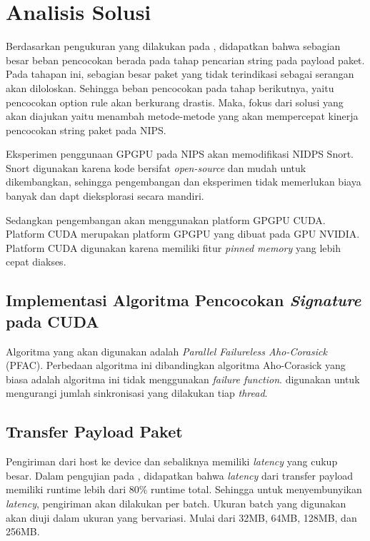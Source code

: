   \section{Analisis Solusi}
  

    Berdasarkan pengukuran yang dilakukan pada \parencite{kargus2012}, didapatkan bahwa sebagian besar beban pencocokan berada pada tahap  pencarian string pada payload paket. Pada tahapan ini, sebagian besar paket yang tidak terindikasi sebagai serangan akan diloloskan. Sehingga beban pencocokan pada tahap berikutnya, yaitu pencocokan option rule akan berkurang drastis. Maka, fokus dari solusi yang akan diajukan yaitu menambah metode-metode yang akan mempercepat kinerja pencocokan string paket pada NIPS.

    Eksperimen penggunaan GPGPU pada NIPS akan memodifikasi NIDPS Snort. Snort digunakan karena kode bersifat \emph{open-source} dan mudah untuk dikembangkan, sehingga pengembangan dan eksperimen tidak memerlukan biaya banyak dan dapt dieksplorasi secara mandiri. 

    Sedangkan pengembangan akan menggunakan platform GPGPU CUDA. Platform CUDA merupakan platform GPGPU yang dibuat pada GPU NVIDIA. Platform CUDA digunakan karena memiliki fitur \emph{pinned memory} yang lebih cepat diakses.

    \subsection{Implementasi Algoritma Pencocokan \emph{Signature} pada CUDA}

      Algoritma yang akan digunakan adalah \emph{Parallel Failureless Aho-Corasick} (PFAC). Perbedaan algoritma ini dibandingkan algoritma Aho-Corasick yang biasa adalah algoritma ini tidak menggunakan \emph{failure function}. digunakan untuk mengurangi jumlah sinkronisasi yang dilakukan tiap \emph{thread}. 

    \subsection{Transfer Payload Paket}

      Pengiriman dari host ke device dan sebaliknya memiliki \emph{latency} yang cukup besar. Dalam pengujian pada \parencite{gnort2008}, didapatkan bahwa \emph{latency} dari transfer payload memiliki runtime lebih dari 80\% runtime total. Sehingga untuk menyembunyikan \emph{latency}, pengiriman akan dilakukan per batch. Ukuran batch yang digunakan akan diuji dalam ukuran yang bervariasi. Mulai dari 32MB, 64MB, 128MB, dan 256MB.


